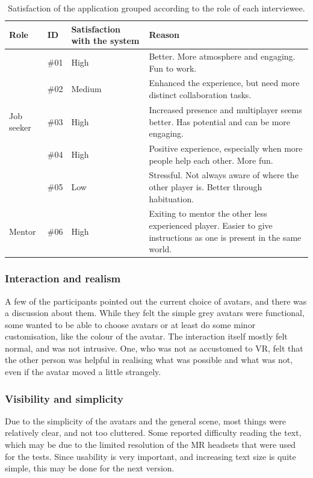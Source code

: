 \begin{table}[!ht]
      \centering
        \begin{tabular}{llp{2.5cm}p{5cm}}
        \toprule
        Role & ID & Satisfaction with the system & Reason\\
        \midrule
         & \#01 & High & Better. More atmosphere and engaging. Fun to work.\\\vspace{0.2cm}
         & \#02  & Medium & Enhanced the experience, but need more distinct collaboration tasks.\\\vspace{0.2cm}
         Job seeker & \#03  & High & Increased presence and multiplayer seems better. Has potential and can be more engaging.\\\vspace{0.2cm}
         & \#04 & High & Positive experience, especially when more people help each other. More fun.  \\\vspace{0.2cm}
         & \#05  & Low & Stressful. Not always aware of where the other player is. Better through habituation. \\\midrule
        Mentor & \#06  & High &  Exiting to mentor the other less experienced player. Easier to give instructions as one is present in the same world. \\
        \bottomrule
        \end{tabular}
        \caption{Satisfaction of the application grouped according to the role of each interviewee.}
        \label{table:satificationInterview1}
\end{table}


\subsubsection{Interaction and realism}
A few of the participants pointed out the current choice of avatars, and there was a discussion about them. While they felt the simple grey avatars were functional, some wanted to be able to choose avatars or at least do some minor customisation, like the colour of the avatar. The interaction itself mostly felt normal, and was not intrusive. One, who was not as accustomed to VR, felt that the other person was helpful in realising what was possible and what was not, even if the avatar moved a little strangely.

\subsubsection{Visibility and simplicity}
Due to the simplicity of the avatars and the general scene, most things were relatively clear, and not too cluttered. Some reported difficulty reading the text, which may be due to the limited resolution of the MR headsets that were used for the tests. Since usability is very important, and increasing text size is quite simple, this may be done for the next version.

